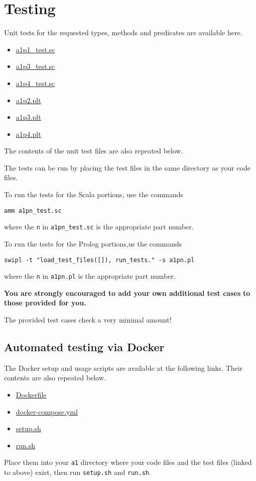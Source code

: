 \documentclass[11pt]{article}
\begin{document}
\section*{Testing}
\label{sec:org7328565}
Unit tests for the requested types, methods and predicates
are available here.
\begin{itemize}
\item \href{./testing/a1/a1p1\_test.sc}{a1p1\_test.sc}
\item \href{./testing/a1/a1p3\_test.sc}{a1p3\_test.sc}
\item \href{./testing/a1/a1p4\_test.sc}{a1p4\_test.sc}
\item \href{./testing/a1/a1p2.plt}{a1p2.plt}
\item \href{./testing/a1/a1p3.plt}{a1p3.plt}
\item \href{./testing/a1/a1p4.plt}{a1p4.plt}
\end{itemize}
The contents of the unit test files are also repeated below.

The tests can be run by placing the test files
in the same directory as your code files.

To run the tests for the Scala portions, use the commands
\begin{verbatim}
amm a1pn_test.sc
\end{verbatim}
where the \texttt{n} in \texttt{a1pn\_test.sc} is the appropriate part number.

To run the tests for the Prolog portions,us the commands
\begin{verbatim}
swipl -t "load_test_files([]), run_tests." -s a1pn.pl
\end{verbatim}
where the \texttt{n} in \texttt{a1pn.pl} is the appropriate part number.

\begin{center}
\textbf{You are strongly encouraged to add your own additional test cases}
\textbf{to those provided for you.}

The provided test cases check a very minimal amount!
\end{center}

\subsection*{Automated testing via Docker}
\label{sec:orgf610096}
The Docker setup and usage scripts are available at the following links.
Their contents are also repeated below.
\begin{itemize}
\item \href{./testing/a1/Dockerfile}{Dockerfile}
\item \href{./testing/a1/docker-compose.yml}{docker-compose.yml}
\item \href{./testing/a1/setup.sh}{setup.sh}
\item \href{./testing/a1/run.sh}{run.sh}
\end{itemize}
Place them into your \texttt{a1} directory where your code files
and the test files (linked to above) exist,
then run \texttt{setup.sh} and \texttt{run.sh}.
\end{document}
